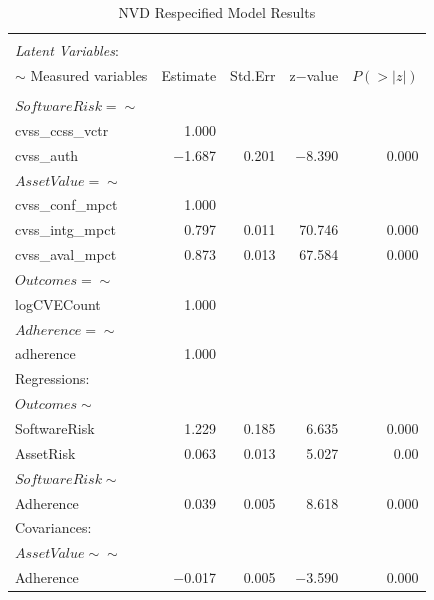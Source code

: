 \begin{table}
	\begin{center}	
		\caption{NVD Respecified Model Results}
		\label{tab:results_nvd}
		\begin{tabular}{l|rrrr}
				\\[-1.8ex]\hline 
				\hline \\[-1.8ex] 
			\textit{Latent Variables}:  & & & & \\  
			$\sim$ Measured variables& Estimate & Std.Err & z$-$value & $P(>|z|)$ \\
				\hline \\[-1.8ex]
			$SoftwareRisk =\sim$  & & & & \\                                   
			cvss\_ccss\_vctr   & 1.000 & &  & \\                             
			cvss\_auth     &   $-$1.687  &  0.201  & $-$8.390   & 0.000\\
			$AssetValue =\sim$     & & & & \\                                    
			cvss\_conf\_mpct   & 1.000     & & & \\                       
			cvss\_intg\_mpct   & 0.797   & 0.011 & 70.746 &   0.000 \\
			cvss\_aval\_mpct  &  0.873   & 0.013 & 67.584   & 0.000 \\
			$Outcomes =\sim$    & & & & \\                                     
			logCVECount     &  1.000  & & & \\                          
			$Adherence =\sim$   & & & & \\                                      
			adherence    &     1.000        & & & \\                    
			Regressions:  & & & & \\  
			$Outcomes \sim$         & & & & \\                                     
			SoftwareRisk   &  1.229 &   0.185 & 6.635 &   0.000 \\
			AssetRisk     &   0.063  &  0.013  &  5.027 &   0.00\\
			$SoftwareRisk \sim$        & & & & \\                                  
			Adherence     &    0.039 &   0.005  &  8.618 &   0.000\\
			Covariances:  & & & & \\  
			$AssetValue \sim\sim$          & & & & \\                                 
			Adherence      &  $-$0.017  &  0.005 &  $-$3.590 &   0.000\\
		\end{tabular}
	\end{center}
\end{table}

